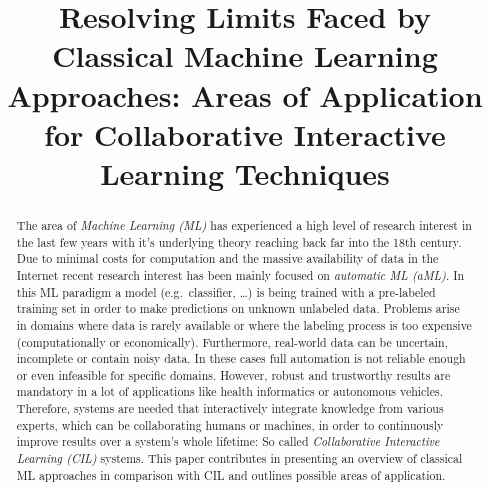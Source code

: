 \documentclass[conference]{IEEEtran}
\begin{document}
\title{Resolving Limits Faced by Classical Machine Learning Approaches: Areas of Application for 
Collaborative Interactive Learning Techniques}


\author{
}

\maketitle

\begin{abstract}
The area of \textit{Machine Learning (ML)} has experienced a high 
level of research interest in the last few years with it's underlying 
theory reaching back far into the 18th century. Due to minimal 
costs for computation and the massive availability of data in the 
Internet recent research interest has been mainly focused on 
\textit{automatic ML (aML)}. In this ML paradigm a model 
(e.g.\ classifier, \dots) is being trained with a pre-labeled training 
set in order to make predictions on unknown unlabeled data. Problems arise 
in domains where data is rarely available or where the labeling process is 
too expensive (computationally or economically). Furthermore, real-world data 
can be uncertain, incomplete or contain noisy data. In these cases 
full automation is not reliable enough or even infeasible for specific 
domains. However, robust and trustworthy results are mandatory in a lot of 
applications like health informatics or autonomous vehicles. 
Therefore, systems are needed that interactively integrate knowledge from 
various experts, which can be collaborating humans or machines, in order 
to continuously improve results over a system's whole lifetime: So called 
\textit{Collaborative Interactive Learning (CIL)} systems.
This paper contributes in presenting an overview of classical ML approaches 
in comparison with CIL and outlines possible areas of application. 
\end{abstract}
\end{document}

